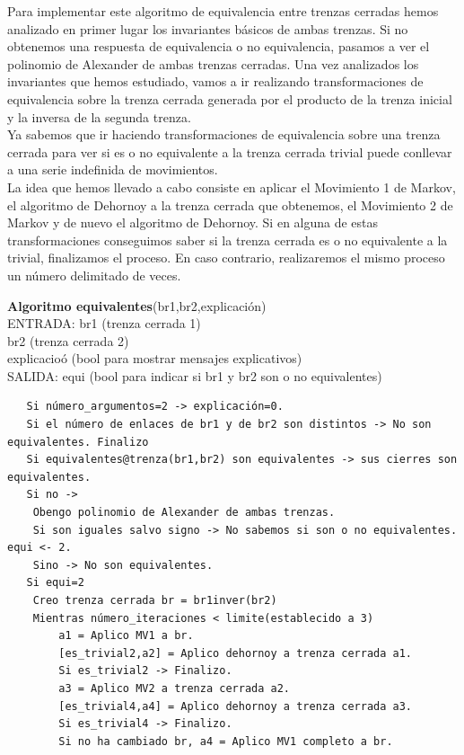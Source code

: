 Para implementar este algoritmo de equivalencia entre trenzas cerradas hemos analizado en primer lugar los invariantes básicos de ambas trenzas. Si no obtenemos una respuesta de equivalencia  o no equivalencia, pasamos a ver el polinomio de Alexander de ambas trenzas cerradas. Una vez analizados los invariantes que hemos estudiado, vamos a ir realizando transformaciones de equivalencia sobre la trenza cerrada generada por el producto de la trenza inicial y la inversa de la segunda trenza. \\

Ya sabemos que ir haciendo transformaciones de equivalencia sobre una trenza cerrada para ver si es o no equivalente a la trenza cerrada trivial puede conllevar a una serie indefinida de movimientos. \\

La idea que hemos llevado a cabo consiste en aplicar el Movimiento 1 de Markov, el algoritmo de Dehornoy a la trenza cerrada que obtenemos, el Movimiento 2 de Markov y de nuevo el algoritmo de Dehornoy. Si en alguna de estas transformaciones conseguimos saber si la trenza cerrada es o no equivalente a la trivial, finalizamos el proceso. En caso contrario, realizaremos el mismo proceso un número delimitado de veces. \\

\newpage
\begin{alg}
	\textbf{Algoritmo equivalentes}(br1,br2,explicación)\\
	ENTRADA: br1 (trenza cerrada 1)\\
	\hspace*{2.2cm} br2 (trenza cerrada 2)\\
	\hspace*{2.2cm} explicacioó (bool para mostrar mensajes explicativos)\\
	SALIDA: \hspace{0.4cm} equi (bool para indicar si br1 y br2 son o no equivalentes)
	
\begin{lstlisting}
   Si número_argumentos=2 -> explicación=0.
   Si el número de enlaces de br1 y de br2 son distintos -> No son equivalentes. Finalizo
   Si equivalentes@trenza(br1,br2) son equivalentes -> sus cierres son equivalentes.
   Si no ->   
   	Obengo polinomio de Alexander de ambas trenzas.
	Si son iguales salvo signo -> No sabemos si son o no equivalentes. equi <- 2.
	Sino -> No son equivalentes.
   Si equi=2
    Creo trenza cerrada br = br1inver(br2)
    Mientras número_iteraciones < limite(establecido a 3)
	    a1 = Aplico MV1 a br.
	    [es_trivial2,a2] = Aplico dehornoy a trenza cerrada a1. 
	    Si es_trivial2 -> Finalizo.
	    a3 = Aplico MV2 a trenza cerrada a2.
	    [es_trivial4,a4] = Aplico dehornoy a trenza cerrada a3. 
	    Si es_trivial4 -> Finalizo.
	    Si no ha cambiado br, a4 = Aplico MV1 completo a br. 
	   
\end{lstlisting}
\end{alg}

